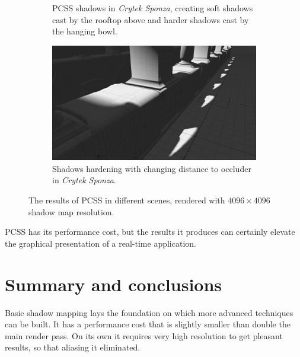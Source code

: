 \begin{figure}[h]
\begin{subfigure}[t]{0.49\textwidth}
        \caption{PCSS shadows in \textit{Crytek Sponza}, creating soft shadows cast by the rooftop above and harder shadows cast by the hanging bowl.}
    \end{subfigure}
	\hfill
    \begin{subfigure}[t]{0.49\textwidth}
		\centering
        \includegraphics[width=\textwidth]{./graf/tests/pcss/cropped/sponza_pcss_2.png}
        \caption{Shadows hardening with changing distance to occluder in \textit{Crytek Sponza}.}
    \end{subfigure}

    \caption{The results of PCSS in different scenes, rendered with \(4096\times 4096\) shadow map resolution.}
    \label{fig:test_pcss_screens}
\end{figure}

PCSS has its performance cost, but the results it produces can certainly elevate the graphical presentation of a real-time application.

\section{Summary and conclusions}

Basic shadow mapping lays the foundation on which more advanced techniques can be built. It has a performance cost that is slightly smaller than double the main render pass. On its own it requires very high resolution to get pleasant results, so that aliasing it eliminated.

